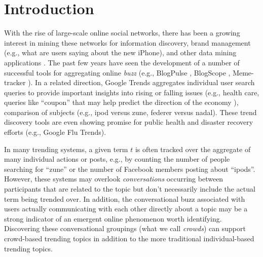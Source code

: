 \documentclass{sig-alternate}
\begin{document}
\section{Introduction}
\label{sec:introduction}
With the rise of large-scale online social networks, there has been a growing
interest in mining these networks for information discovery, brand management
(e.g., what are users saying about the new iPhone), and other data mining
applications \cite{guo:pattern, zheleva:affiliation, cha:filkr, matsuo:gravity}.
The past few years have seen the development of a number of successful
tools for aggregating online \textit{buzz} (e.g., BlogPulse
\cite{website.blogpulse}, BlogScope \cite{bansal:blogscope}, Meme-tracker
\cite{leskovec:meme}).
In a related direction, Google
Trends aggregates individual user search queries to provide important insights
into rising or falling issues (e.g., health care, queries like ``coupon'' that
may help predict the direction of the economy \cite{choi:google}), comparison of
subjects (e.g., ipod versus zune, federer versus nadal). These trend discovery
tools are even showing promise for public health and disaster recovery efforts
(e.g., Google Flu Trends).


In many trending systems, a given term $t$ is often tracked over the aggregate of many individual actions or posts, e.g., by counting the number of people searching for ``zune'' or the number of Facebook members posting about ``ipods''. However, these systems may overlook \textit{conversations} occurring between participants that are related to the topic but don't necessarily include the actual term being trended over. In addition, the conversational buzz associated with users actually communicating with each other directly about a topic may be a strong indicator of an emergent online phenomenon worth identifying. Discovering these conversational groupings (what we call \textit{crowds}) can support crowd-based trending topics in addition to the more traditional individual-based trending topics.  %
\end{document}
